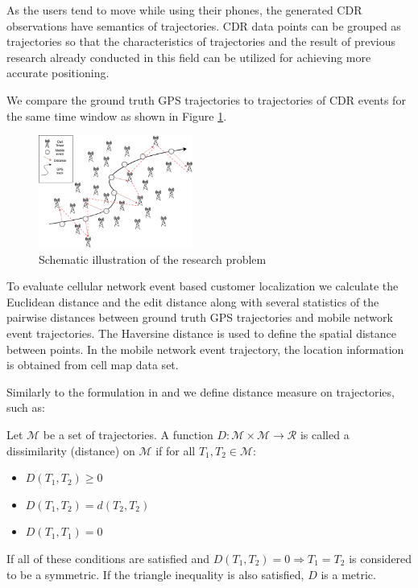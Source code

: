 As the users tend to move while using their phones, the generated CDR observations have semantics of trajectories. CDR data points can be grouped as trajectories so that the characteristics of trajectories and the result of previous research already conducted in this field can be utilized for achieving more accurate positioning.

We compare the ground truth GPS trajectories to trajectories of CDR events for the same time window as shown in Figure \ref{fig:problem}. 
\begin{figure}[h]
    \centering
    \includegraphics[width=0.45\textwidth]{images/problem.png}
    \caption{Schematic illustration of the research problem}
    \label{fig:problem}
\end{figure}

To evaluate cellular network event based customer localization we calculate the Euclidean distance and the edit distance along with several statistics of the pairwise distances between ground truth GPS trajectories and mobile network event trajectories. The Haversine distance is used to define the spatial distance between points. In the mobile network event trajectory, the location information is obtained from cell map data set.

Similarly to the formulation in \cite{encyclopedia} and \cite{distance-def} we define distance measure on trajectories, such as:
\begin{definition}
Let $\mathcal{M}$ be a set of trajectories. A function $D :\mathcal{M} \times \mathcal{M} \rightarrow \mathcal{R}$  is called a dissimilarity (distance) on $\mathcal{M}$ if for all $T_{1}, T_{2} \in \mathcal{M}$: 
\begin{itemize}
    \item $D(T_{1},T_{2}) \geqslant 0$
    \item $D(T_{1},T_{2}) = d(T_{2},T_{2})$
    \item $D(T_{1},T_{1}) = 0$
\end{itemize}
If all of these conditions are satisfied and $D(T_{1}, T_{2}) = 0 \Rightarrow  T_{1} = T_{2} $ is considered to be a symmetric. If
the triangle inequality is also satisfied, $D$ is a metric.
\end{definition}

